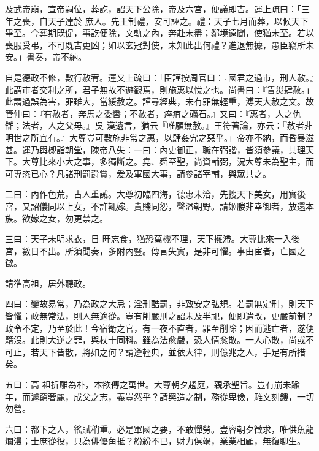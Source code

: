 \begin{pinyinscope}
 及武帝崩，宣帝嗣位，葬訖，詔天下公除，帝及六宮，便議即吉。運上疏曰：「三年之喪，自天子達於
 庶人。先王制禮，安可誣之。禮：天子七月而葬，以候天下畢至。今葬期既促，事訖便除，文軌之內，奔赴未盡；鄰境遠聞，使猶未至。若以喪服受弔，不可既吉更凶；如以玄冠對使，未知此出何禮？進退無據，愚臣竊所未安。」書奏，帝不納。



 自是德政不修，數行赦宥。運又上疏曰：「臣謹按周官曰：『國君之過市，刑人赦。』此謂市者交利之所，君子無故不遊觀焉，則施惠以悅之也。尚書曰：『眚災肆赦。」此謂過誤為害，罪雖大，當緩赦之。謹尋經典，未有罪無輕重，溥天大赦之文。故管仲曰：『有赦者，奔馬之委轡；不赦者，痤疽之礪石。』又曰：『惠者，人之仇讎；法者，人之父母。』吳
 漢遺言，猶云『唯願無赦。』王符著論，亦云：『赦者非明世之所宜有。』大尊豈可數施非常之惠，以肆姦宄之惡乎。」帝亦不納，而昏暴滋甚。運乃輿櫬詣朝堂，陳帝八失：一曰：內史御正，職在弼諧，皆須參議，共理天下。大尊比來小大之事，多獨斷之。堯、舜至聖，尚資輔弼，況大尊未為聖主，而可專恣已心？凡諸刑罰爵賞，爰及軍國大事，請參諸宰輔，與眾共之。



 二曰：內作色荒，古人重誡。大尊初臨四海，德惠未洽，先搜天下美女，用實後宮，又詔儀同以上女，不許輒嫁。貴賤同怨，聲溢朝野。請姬媵非幸御者，放還本族。欲嫁之女，勿更禁之。



 三曰：天子未明求衣，日
 旰忘食，猶恐萬機不理，天下擁滯。大尊比來一入後宮，數日不出。所須聞奏，多附內豎。傳言失實，是非可懼。事由宦者，亡國之徵。



 請準高祖，居外聽政。



 四曰：變故易常，乃為政之大忌；淫刑酷罰，非致安之弘規。若罰無定刑，則天下皆懼；政無常法，則人無適從。豈有削嚴刑之詔未及半祀，便即遣改，更嚴前制？政令不定，乃至於此！今宿衛之官，有一夜不直者，罪至削除；因而逃亡者，遂便籍沒。此則大逆之罪，與杖十同科。雖為法愈嚴，恐人情愈散。一人心散，尚或不可止，若天下皆散，將如之何？請遵輕典，並依大律，則億兆之人，手足有所措矣。



 五曰：高
 祖折雕為朴，本欲傳之萬世。大尊朝夕趨庭，親承聖旨。豈有崩未踰年，而遽窮奢麗，成父之志，義豈然乎？請興造之制，務從卑儉，雕文刻鏤，一切勿營。



 六曰：都下之人，徭賦稍重。必是軍國之要，不敢憚勞。豈容朝夕徵求，唯供魚龍爛漫；士庶從役，只為俳優角抵？紛紛不已，財力俱竭，業業相顧，無復聊生。




\end{pinyinscope}
